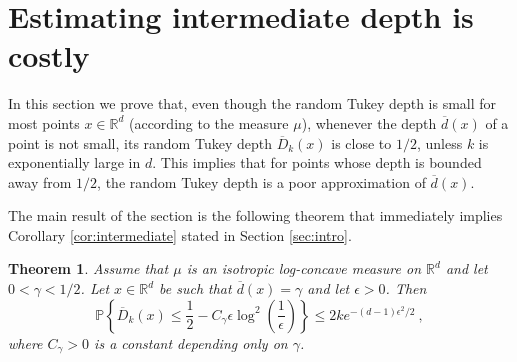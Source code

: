 \documentclass[12pt]{article}
\newcommand{\R}{\mathbb{R}}
\newcommand{\PP}{\mathbb{P}}
\newcommand{\ol}{\overline}
\newtheorem{theorem}{Theorem}
\begin{document}
\section{Estimating intermediate depth is costly}
\label{sec:intermediate}

In this section we prove that, even though the random Tukey depth
is small for most points $x\in \R^d$ (according to the measure $\mu$), whenever the
depth $\ol{d}(x)$ of a point is not small, its random Tukey depth $\ol{D}_k(x)$ is close to
$1/2$, unless $k$ is exponentially large in $d$. This implies that for points whose
depth is bounded away from $1/2$, the random Tukey depth is a poor approximation of $\ol{d}(x)$.


The main result of the section is the following theorem that immediately implies Corollary \ref{cor:intermediate} stated in Section \ref{sec:intro}.


\begin{theorem}
\label{thm:intermediate}
Assume that $\mu$ is an isotropic log-concave measure on $\R^d$ and let
$0<\gamma<1/2$. Let $x\in\R^d$ be such that $\ol{d}(x)=\gamma$ and let $\epsilon >0$.
Then
\[
  \PP\left\{ \ol{D}_k(x)\leq \frac{1}{2}-C_{\gamma}\epsilon\log^2\left( \frac{1}{\epsilon}\right) \right\}  \leq  2ke^{-(d-1)\epsilon^2/2}~,
\]
where $C_{\gamma}>0$ is a constant depending only on $\gamma$.
\end{theorem}
\end{document}
